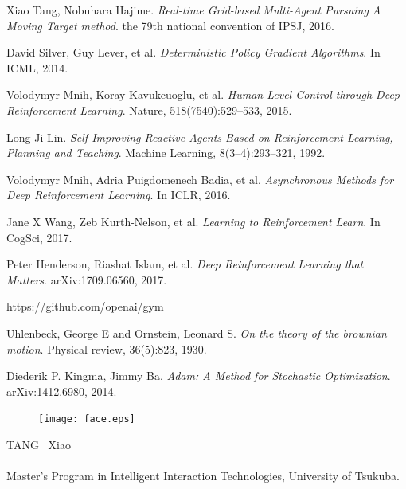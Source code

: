\documentclass[11pt,twocolumn]{jarticle} %
\begin{document}
\begin{thebibliography}{99}
Xiao Tang, Nobuhara Hajime. \textsl{Real-time Grid-based Multi-Agent Pursuing A Moving Target method}. the 79th national convention of IPSJ, 2016. 

David Silver, Guy Lever, et al. \textsl{Deterministic Policy Gradient Algorithms}. In ICML, 2014.

Volodymyr Mnih, Koray Kavukcuoglu, et al. \textsl{Human-Level Control through Deep Reinforcement Learning}. Nature, 518(7540):529–533, 2015.

Long-Ji Lin. \textsl{Self-Improving Reactive Agents Based on Reinforcement Learning, Planning and Teaching}. Machine Learning, 8(3–4):293–321, 1992.

Volodymyr Mnih, Adria Puigdomenech Badia, et al. \textsl{Asynchronous Methods for Deep Reinforcement Learning}. In ICLR, 2016.

Jane X Wang, Zeb Kurth-Nelson, et al. \textsl{Learning to Reinforcement Learn}. In CogSci, 2017.

Peter Henderson, Riashat Islam, et al. \textsl{Deep Reinforcement Learning that Matters}. arXiv:1709.06560, 2017.

https://github.com/openai/gym

Uhlenbeck, George E and Ornstein, Leonard S. \textsl{On the theory of the brownian motion}. Physical
review, 36(5):823, 1930.

Diederik P. Kingma, Jimmy Ba. \textsl{Adam: A Method for Stochastic Optimization}. arXiv:1412.6980, 2014.

\end{thebibliography}

\vspace{2zh}
\begin{minipage}{76mm}
 \begin{figure}
 \begin{center}
  \texttt{[image: face.eps]}
 \end{center}
 \end{figure}
 \noindent TANG \ Xiao \\
 \\
 Master's Program in Intelligent Interaction Technologies, University of Tsukuba.
\end{minipage}
\vspace{3zh}

\end{document}
